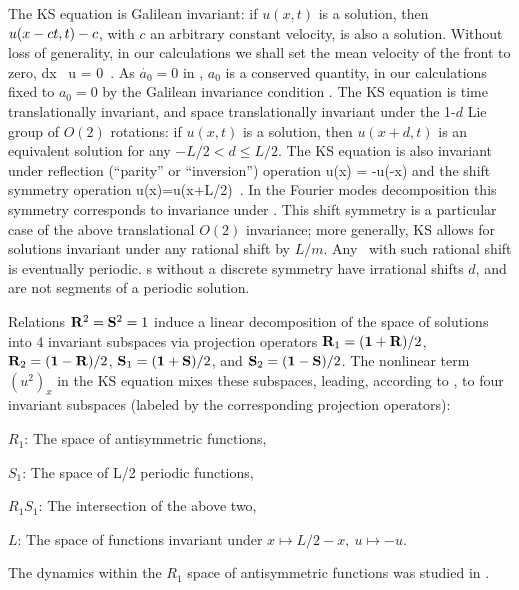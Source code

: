 The  KS equation is
Galilean invariant: if $u(x,t)$ is a solution, then
$u(x -ct,t) -c $, with $c$ an arbitrary constant velocity, 
is also a solution.
Without loss of generality, in our calculations we shall set
the mean velocity of the  front to zero,
\beq
\int dx \, u = 0
\,.
As  $\dot{a_0}=0$ in ,
$a_0$ is a conserved quantity, in our calculations
fixed to $a_0=0$ by the Galilean invariance condition .
The KS equation   is time translationally invariant,
and
space translationally invariant
under the 1-$d$ Lie group of $O(2)$ rotations: if
$u(x,t)$ is a solution, then $u(x+d,t)$ is an equivalent
solution for any $-L/2 < d \leq L/2$.
The KS equation is also invariant under
reflection (``parity'' or ``inversion'') operation
\beq
\Refl u(x) = -u(-x)
and the shift symmetry operation
\beq
\Shift u(x)=u(x+L/2)
\,.
In the Fourier modes decomposition  this
symmetry corresponds to invariance under
.
This shift symmetry is a particular case of the
above translational $O(2)$ invariance; more generally,
KS allows for solutions invariant under any rational shift by
$L/m$. Any \rpo\ with such rational shift is eventually periodic.
\Rpo s without a discrete symmetry have irrational shifts
$d$, and are not segments of a periodic solution.


Relations $\mathbf{R}^2=\mathbf{S}^2=1$
induce a linear decomposition of the space of solutions into 4 invariant
subspaces via projection operators
$\mathbf{R}_1=(\mathbf 1+\mathbf{R})/2$,
$\mathbf{R}_2=(\mathbf 1-\mathbf{R})/2$,
$\mathbf{S}_1=(\mathbf 1+\mathbf{S})/2$, and
$\mathbf{S}_2=(\mathbf 1-\mathbf{S})/2$. The nonlinear term $(u^2)_x$ in the KS equation
mixes these subspaces, leading,
according to , to four invariant subspaces
(labeled by the corresponding projection operators):
\begin{romannum} %

 \item[$R_1$:] The space of antisymmetric functions,
 \item[$S_1$:] The space of L/2 periodic functions,
 \item[$R_1 S_1$:] The intersection of the above two,
 \item[$L$:] The space of functions invariant under $x\mapsto L/2-x,\ u\mapsto -u$.

\end{romannum} %
The dynamics within the $R_1$ space of antisymmetric functions
was studied in .


